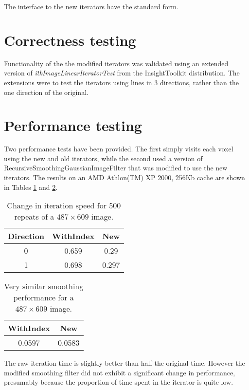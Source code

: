 \documentclass{InsightArticle}
\begin{document}
The interface to the new iterators have the standard form.

\section{Correctness testing}
Functionality of the the modified iterators was validated using an
extended version of {\em itkImageLinearIteratorTest} from the
InsightToolkit distribution. The extensions were to test the iterators
using lines in 3 directions, rather than the one direction of the
original.

\section{Performance testing}
Two performance tests have been provided. The first simply visits each
voxel using the new and old iterators, while the second used a version
of RecursiveSmoothingGaussianImageFilter that was modified to use the
new iterators. The results on an AMD Athlon(TM) XP 2000, 256Kb cache are shown in Tables \ref{tab:iterationPerf} and \ref{tab:smoothingPerf}.

\begin{table}[htbp]
\centering
\begin{tabular}{ccc}
\hline
Direction  &  WithIndex &  New \\
\hline
0   &    0.659  & 0.29 \\
1   &    0.698  & 0.297 \\
\hline
\end{tabular}
\caption{Change in iteration speed for 500 repeats of a $487 \times 609$ image. \label{tab:iterationPerf}}
\end{table}

\begin{table}[htbp]
\centering
\begin{tabular}{cc}
\hline
WithIndex &  New \\
\hline
0.0597 & 0.0583 \\
\hline
\end{tabular}
\caption{Very similar smoothing performance for a $487 \times 609$ image. \label{tab:smoothingPerf}}
\end{table}

The raw iteration time is slightly better than half the original
time. However the modified smoothing filter did not exhibit a
significant change in performance, presumably because the proportion
of time spent in the iterator is quite low.

\appendix





\nocite{ITKSoftwareGuide}
\end{document}
